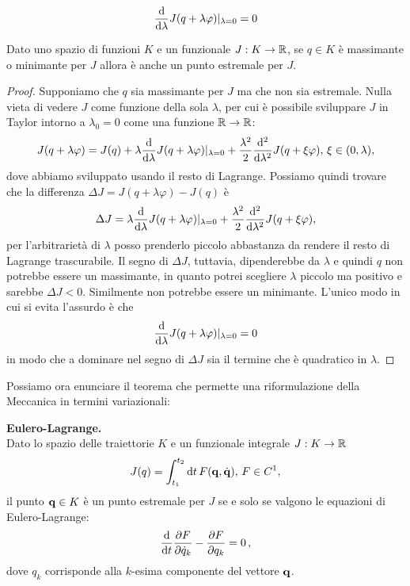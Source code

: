     \begin{equation}
        \frac{\mathrm{d}}{\mathrm{d} \lambda}J(q+\lambda \varphi)|_{\lambda=0} = 0
    \end{equation}
    \begin{theorem}
        Dato uno spazio di funzioni $K$ e un funzionale $J:K\to \mathbb{R}$, se $q\in K$ è massimante o minimante per $J$ allora è anche un punto estremale per $J$.       
    \end{theorem}
    \begin{proof}
        Supponiamo che $q$ sia massimante per $J$ ma che non sia estremale. Nulla vieta di vedere $J$ come funzione della sola $\lambda$, per cui è possibile sviluppare $J$ in Taylor intorno a $\lambda_0=0$ come una funzione $\mathbb{R} \to \mathbb{R}$:
        \begin{equation}
            J(q+\lambda\varphi) = J(q) + \lambda\frac{\mathrm{d}}{\mathrm{d} \lambda}J(q+\lambda \varphi)|_{\lambda=0} + \frac{\lambda^2}{2}\frac{\mathrm{d}^2}{\mathrm{d} \lambda^2}J(q+\xi \varphi),\, \xi \in(0,\lambda),
        \end{equation}
        dove abbiamo sviluppato usando il resto di Lagrange. Possiamo quindi trovare che la differenza $\Delta J = J(q+\lambda \varphi)-J(q)$ è 
        \begin{equation}
            \Delta J = \lambda\frac{\mathrm{d}}{\mathrm{d} \lambda}J(q+\lambda \varphi)|_{\lambda=0} + \frac{\lambda^2}{2}\frac{\mathrm{d}^2}{\mathrm{d} \lambda^2}J(q+\xi \varphi),
        \end{equation}
        per l'arbitrarietà di $\lambda$ posso prenderlo piccolo abbastanza da rendere il resto di Lagrange trascurabile. Il segno di $\Delta J$, tuttavia, dipenderebbe da $\lambda$ e quindi $q$ non potrebbe essere un massimante, in quanto potrei scegliere $\lambda$ piccolo ma positivo e sarebbe $\Delta J<0$. Similmente non potrebbe essere un minimante. L'unico modo in cui si evita l'assurdo è che 
        \begin{equation}
            \frac{\mathrm{d}}{\mathrm{d} \lambda}J(q+\lambda \varphi)|_{\lambda=0} = 0
        \end{equation}
        in modo che a dominare nel segno di $\Delta J$ sia il termine che è quadratico in $\lambda$.
    \end{proof}
    Possiamo ora enunciare il teorema che permette una riformulazione della Meccanica in termini variazionali:
    \begin{theorem}
        \textbf{Eulero-Lagrange.}\\
        Dato lo spazio delle traiettorie $K$ e un funzionale integrale $J:K\to \mathbb{R}$
        \begin{equation}
            J(q) = \int_{t_1}^{t_2} \mathrm{d} t\,F(\mathbf{q}, \dot{\mathbf{q}}),\,F \in C^1,
        \end{equation}
        il punto $\mathbf{q} \in K$ è un punto estremale per $J$ se e solo se valgono le equazioni di Eulero-Lagrange:
        \begin{equation}
            \frac{\mathrm{d}}{\mathrm{d}t} \frac{\partial F}{\partial \dot{q}_k} -\frac{\partial F}{\partial q_k} = 0\,,
        \end{equation}
        dove $q_k$ corrisponde alla $k$-esima componente del vettore $\mathbf{q}$.
    \end{theorem}
